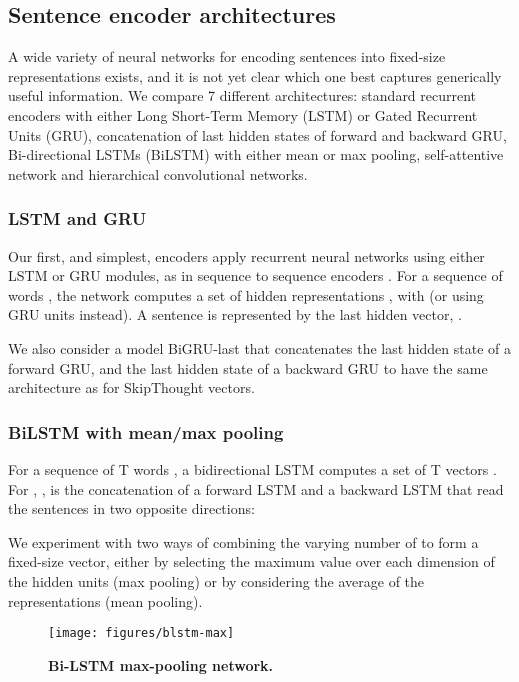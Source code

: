 \documentclass[11pt,letterpaper]{article}
\begin{document}
\subsection{Sentence encoder architectures}
A wide variety of neural networks for encoding sentences into fixed-size representations exists, and it is not yet clear which one best captures generically useful information. We compare 7 different architectures: standard recurrent encoders with either Long Short-Term Memory (LSTM) or Gated Recurrent Units (GRU), concatenation of last hidden states of forward and backward GRU, Bi-directional LSTMs (BiLSTM) with either mean or max pooling, self-attentive network and hierarchical convolutional networks.

\subsubsection{LSTM and GRU}
Our first, and simplest, encoders apply recurrent neural networks using either LSTM \cite{hochreiter1997long} or GRU \cite{cho2014properties} modules, as in sequence to sequence encoders \cite{sutskever2014sequence}.
For a sequence of  words , the network computes a set of  hidden representations , 
with  (or using GRU units instead). A sentence is represented by the last hidden vector, .

We also consider a model BiGRU-last that concatenates the last hidden state of a forward GRU, and the last hidden state of a backward GRU to have the same architecture as for SkipThought vectors.

\subsubsection{BiLSTM with mean/max pooling}
For a sequence of T words , a bidirectional LSTM computes a set of T vectors . For , , is the concatenation of a forward LSTM and a backward LSTM that read the sentences in two opposite directions: 

We experiment with two ways of combining the varying number of  to form a fixed-size vector, either by selecting the maximum value over each dimension of the hidden units (max pooling) \cite{collobert2008unified} or by considering the average of the representations (mean pooling).

\begin{figure}[h!]
  \centering
  \texttt{[image: figures/blstm-max]}
    \caption{\bf Bi-LSTM max-pooling network.}
  \label{fig:blstmmax}
\end{figure}
\end{document}

